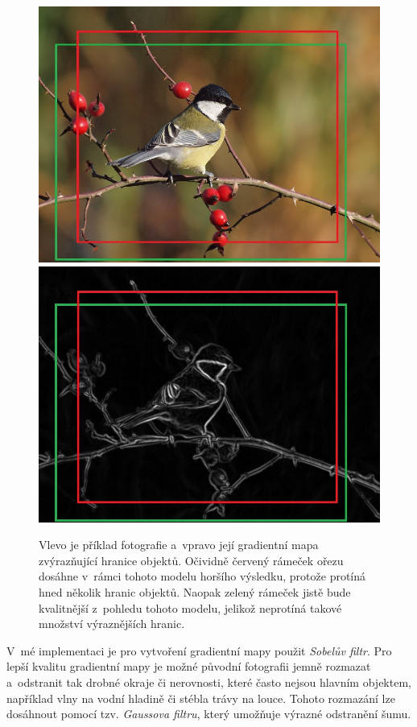 \begin{figure}[H]
  \centering
  \includegraphics[scale=1.0]{obrazky/sykora-ROIs.jpg} \qquad
  \includegraphics[scale=1.0]{obrazky/sykora-ROIsGrad.jpg}
  \caption{Vlevo je příklad fotografie a~vpravo její gradientní mapa zvýrazňující hranice objektů. Očividně červený rámeček ořezu dosáhne v~rámci tohoto modelu horšího výsledku, protože protíná hned několik hranic objektů. Naopak zelený rámeček jistě bude kvalitnější z~pohledu tohoto modelu, jelikož neprotíná takové množství výraznějších hranic.}
  \label{obr:boundarysimplicitymodel}
\end{figure}

V~mé implementaci je pro vytvoření gradientní mapy použit \emph{Sobelův filtr}. Pro lepší kvalitu gradientní mapy je možné původní fotografii jemně rozmazat a~odstranit tak drobné okraje či nerovnosti, které často nejsou hlavním objektem, například vlny na vodní hladině či stébla trávy na louce. Tohoto rozmazání lze dosáhnout pomocí tzv. \emph{Gaussova filtru}, který umožňuje výrazné odstranění šumu.

